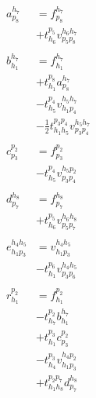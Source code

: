 \documentclass{article}
\begin{document}
{\Large
\begin{align}
a ^{ h_{7} } _{ p_{8} } &= f ^{ h_{7} } _{ p_{8} }\tag{cc2\_t1\_2\_2\_1}\\
                        &+ t ^{ p_{5} } _{ h_{6} } v ^{ h_{6} h_{7} } _{ p_{5} p_{8} }\tag{cc2\_t1\_2\_2\_2}\\
\nonumber\\
b ^{ h_{7} } _{ h_{1} } &= f ^{ h_{7} } _{ h_{1} }\tag{cc2\_t1\_2\_1}\\
                        &+ t ^{ p_{8} } _{ h_{1} } a ^{ h_{7} } _{ p_{8} }\tag{cc2\_t1\_2\_2}\\
                        &- t ^{ p_{4} } _{ h_{5} } v ^{ h_{5} h_{7} } _{ h_{1} p_{4} }\tag{cc2\_t1\_2\_3}\\
                        &- \frac{1}{2} t ^{ p_{3} p_{4} } _{ h_{1} h_{5} } v ^{ h_{5} h_{7} } _{ p_{3} p_{4} }\tag{cc2\_t1\_2\_4}\\
\nonumber\\
c ^{ p_{2} } _{ p_{3} } &= f ^{ p_{2} } _{ p_{3} }\tag{cc2\_t1\_3\_1}\\
                        &- t ^{ p_{4} } _{ h_{5} } v ^{ h_{5} p_{2} } _{ p_{3} p_{4} }\tag{cc2\_t1\_3\_2}\\
\nonumber\\
d ^{ h_{8} } _{ p_{7} } &= f ^{ h_{8} } _{ p_{7} }\tag{cc2\_t1\_5\_1}\\
                        &+ t ^{ p_{5} } _{ h_{6} } v ^{ h_{6} h_{8} } _{ p_{5} p_{7} }\tag{cc2\_t1\_5\_2}\\
\nonumber\\
e ^{ h_{4} h_{5} } _{ h_{1} p_{3} } &= v ^{ h_{4} h_{5} } _{ h_{1} p_{3} }\tag{cc2\_t1\_6\_1}\\
                                    &- t ^{ p_{6} } _{ h_{1} } v ^{ h_{4} h_{5} } _{ p_{3} p_{6} }\tag{cc2\_t1\_6\_2}\\
\nonumber\\
r ^{ p_{2} } _{ h_{1} } &= f ^{ p_{2} } _{ h_{1} }\tag{cc2\_t1\_1}\\
                        &- t ^{ p_{2} } _{ h_{7} } b ^{ h_{7} } _{ h_{1} }\tag{cc2\_t1\_2}\\
                        &+ t ^{ p_{3} } _{ h_{1} } c ^{ p_{2} } _{ p_{3} }\tag{cc2\_t1\_3}\\
                        &- t ^{ p_{3} } _{ h_{4} } v ^{ h_{4} p_{2} } _{ h_{1} p_{3} }\tag{cc2\_t1\_4}\\
                        &+ t ^{ p_{2} p_{7} } _{ h_{1} h_{8} } d ^{ h_{8} } _{ p_{7} }\tag{cc2\_t1\_5}\\

\end{align}}
\end{document}
